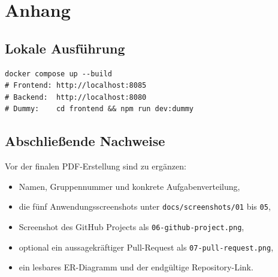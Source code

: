 \documentclass[11pt,a4paper]{article}
\begin{document}
\appendix
\section{Anhang}
\subsection{Lokale Ausführung}
\begin{verbatim}
docker compose up --build
# Frontend: http://localhost:8085
# Backend:  http://localhost:8080
# Dummy:    cd frontend && npm run dev:dummy
\end{verbatim}

\subsection{Abschließende Nachweise}
Vor der finalen PDF-Erstellung sind zu ergänzen:
\begin{itemize}
\item Namen, Gruppennummer und konkrete Aufgabenverteilung,
\item die fünf Anwendungsscreenshots unter
\texttt{docs/screenshots/01} bis \texttt{05},
\item Screenshot des GitHub Projects als
\texttt{06-github-project.png},
\item optional ein aussagekräftiger Pull-Request als
\texttt{07-pull-request.png},
\item ein lesbares ER-Diagramm und der endgültige Repository-Link.
\end{itemize}
\end{document}

